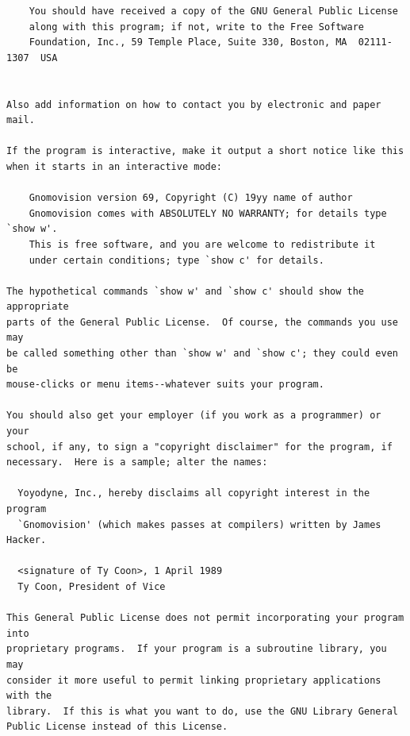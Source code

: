 \documentclass[a4paper,BCOR30mm,DIV14,pdftex,liststotoc,footsepline,openany]{scrbook}
\begin{document}
\begin{verbatim}
    You should have received a copy of the GNU General Public License
    along with this program; if not, write to the Free Software
    Foundation, Inc., 59 Temple Place, Suite 330, Boston, MA  02111-1307  USA


Also add information on how to contact you by electronic and paper mail.

If the program is interactive, make it output a short notice like this
when it starts in an interactive mode:

    Gnomovision version 69, Copyright (C) 19yy name of author
    Gnomovision comes with ABSOLUTELY NO WARRANTY; for details type `show w'.
    This is free software, and you are welcome to redistribute it
    under certain conditions; type `show c' for details.

The hypothetical commands `show w' and `show c' should show the appropriate
parts of the General Public License.  Of course, the commands you use may
be called something other than `show w' and `show c'; they could even be
mouse-clicks or menu items--whatever suits your program.

You should also get your employer (if you work as a programmer) or your
school, if any, to sign a "copyright disclaimer" for the program, if
necessary.  Here is a sample; alter the names:

  Yoyodyne, Inc., hereby disclaims all copyright interest in the program
  `Gnomovision' (which makes passes at compilers) written by James Hacker.

  <signature of Ty Coon>, 1 April 1989
  Ty Coon, President of Vice

This General Public License does not permit incorporating your program into
proprietary programs.  If your program is a subroutine library, you may
consider it more useful to permit linking proprietary applications with the
library.  If this is what you want to do, use the GNU Library General
Public License instead of this License.
\end{verbatim}
\end{document}

